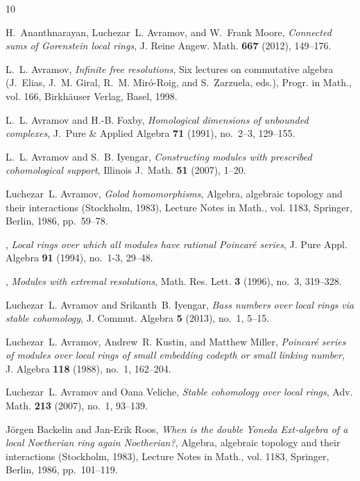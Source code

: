 \documentclass{amsart}
\numberwithin{equation}{section}
\theoremstyle{plain}
\theoremstyle{definition}
\theoremstyle{remark}
\begin{document}
\begin{thebibliography}{10}

H.~Ananthnarayan, Luchezar~L. Avramov, and W.~Frank Moore, \emph{Connected sums
  of {G}orenstein local rings}, J. Reine Angew. Math. \textbf{667} (2012),
  149--176. 

L.~L. Avramov, \emph{{Infinite free resolutions}}, Six lectures on commutative
  algebra (J.~Elias, J.~M. Giral, R.~M. Mir\'o-Roig, and S.~Zarzuela, eds.),
  Progr. in Math., vol. 166, Birkh\"auser Verlag, Basel, 1998.

L.~L. Avramov and H.-B. Foxby, \emph{{Homological dimensions of unbounded
  complexes}}, J.~Pure \& Applied Algebra \textbf{71} (1991), no.~2--3,
  129--155.

L.~L. Avramov and S.~B. Iyengar, \emph{{Constructing modules with prescribed
  cohomological support}}, Illinois J.\ Math. \textbf{51} (2007), 1--20.

Luchezar~L. Avramov, \emph{Golod homomorphisms}, Algebra, algebraic topology
  and their interactions ({S}tockholm, 1983), Lecture Notes in Math., vol.
  1183, Springer, Berlin, 1986, pp.~59--78. 

\bysame, \emph{Local rings over which all modules have rational {P}oincar\'e{}
  series}, J. Pure Appl. Algebra \textbf{91} (1994), no.~1-3, 29--48.

\bysame, \emph{Modules with extremal resolutions}, Math. Res. Lett. \textbf{3}
  (1996), no.~3, 319--328. 

Luchezar~L. Avramov and Srikanth~B. Iyengar, \emph{Bass numbers over local
  rings via stable cohomology}, J. Commut. Algebra \textbf{5} (2013), no.~1,
  5--15. 

Luchezar~L. Avramov, Andrew~R. Kustin, and Matthew Miller, \emph{Poincar\'e{}
  series of modules over local rings of small embedding codepth or small
  linking number}, J. Algebra \textbf{118} (1988), no.~1, 162--204. 

Luchezar~L. Avramov and Oana Veliche, \emph{Stable cohomology over local
  rings}, Adv. Math. \textbf{213} (2007), no.~1, 93--139. 

J\"orgen Backelin and Jan-Erik Roos, \emph{When is the double {Y}oneda
  {E}xt-algebra of a local {N}oetherian ring again {N}oetherian?}, Algebra,
  algebraic topology and their interactions ({S}tockholm, 1983), Lecture Notes
  in Math., vol. 1183, Springer, Berlin, 1986, pp.~101--119. 


\end{thebibliography}
\end{document}

